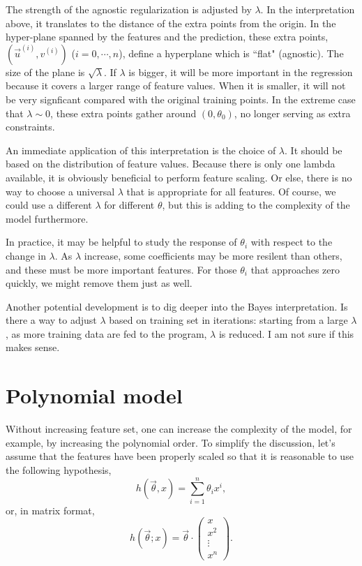 The strength of the agnostic regularization is adjusted by $\lambda$. In the interpretation above, it translates to the distance of the extra points 
from the origin. In the hyper-plane spanned by the features and the prediction, these extra points, $(\vec u^{(i)}, v^{(i)})$ ($i = 0, \cdots, n$), define a 
hyperplane which is ``flat" (agnostic). The size of the plane is $\sqrt\lambda$. If $\lambda$ is bigger, it will be more important in the regression because
it covers a larger range of feature values. When it is smaller, it will not be very signficant compared with the original training points. In the extreme
case that $\lambda\sim0$, these extra points gather around $(0, \theta_0)$, no longer serving as extra constraints.

An immediate application of this interpretation is the choice of $\lambda$. It should be based on the distribution of feature values. Because there is only
one lambda available, it is obviously beneficial to perform feature scaling. Or else, there is no way to choose a universal $\lambda$ that is appropriate 
for all features. Of course, we could use a different $\lambda$ for different $\theta$, but this is adding to the complexity of the model furthermore. 

In practice, it may be helpful to study the response of $\theta_i$ with respect to the change in $\lambda$. As $\lambda$ increase, some coefficients may 
be more resilent than others, and these must be more important features. For those $\theta_i$ that approaches zero quickly, we might 
remove them just as well.


Another potential development is to dig deeper into the Bayes interpretation. Is there a way to adjust $\lambda$ based on training set
in iterations: starting from a large $\lambda$, as more training data are fed to the program, $\lambda$ is reduced. I am not sure if this makes sense.


\section{Polynomial model}
Without increasing feature set, one can increase the complexity of the model, for example, by increasing the polynomial order. To simplify the discussion, let's assume that the features have been properly scaled so that it is reasonable to use the following hypothesis,
\begin{equation}
h(\vec\theta, x) = \sum_{i=1}^n\theta_ix^i,
\end{equation}
or, in matrix format,
\begin{equation}
h(\vec\theta; x) =\vec\theta\cdot\begin{pmatrix}
x\\x^2\\\vdots\\x^n
\end{pmatrix}.
\end{equation}

